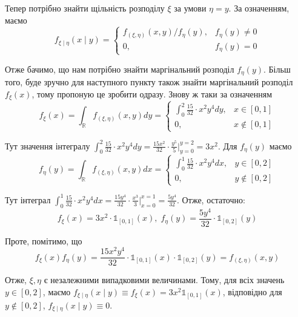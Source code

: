 \documentclass[oneside,solution]{karazin-prob-theory-assign}
\begin{document}
Тепер потрібно знайти щільність розподілу $\xi$ за умови $\eta=y$. За означенням, маємо
\begin{equation}
f_{\xi \mid \eta}(x \mid y) = \begin{cases}
    f_{(\xi,\eta)}(x,y)/f_{\eta}(y), & f_{\eta}(y) \neq 0 \\
    0, & f_{\eta}(y) = 0
\end{cases}    
\end{equation}

Отже бачимо, що нам потрібно знайти маргінальний розподіл $f_{\eta}(y)$. Більш того, буде зручно для наступного пункту також знайти маргінальний розподіл $f_{\xi}(x)$, тому пропоную це зробити одразу. Знову ж таки за означенням
\begin{equation}
    f_{\xi}(x) = \int_{\mathbb{R}}f_{(\xi,\eta)}(x,y)dy = \begin{cases}
        \int_0^2 \frac{15}{32} \cdot x^2y^4 dy, & x \in [0,1] \\
        0, & x \not\in [0,1]
    \end{cases} 
\end{equation}

Тут значення інтегралу $\int_0^2 \frac{15}{32}\cdot x^2y^4dy = \frac{15x^2}{32} \cdot \frac{y^5}{5}\Big|_{y=0}^{y=2} = 3x^2$. Для $f_{\eta}(y)$ маємо
\begin{equation}
    f_{\eta}(y) = \int_{\mathbb{R}}f_{(\xi,\eta)}(x,y)dx = \begin{cases}
        \int_0^1 \frac{15}{32} \cdot x^2y^4dx, & y \in [0,2] \\
        0, & y \not\in [0,2]
    \end{cases}
\end{equation}

Тут інтеграл $\int_0^1 \frac{15}{32}\cdot x^2y^4dx = \frac{15y^4}{32} \cdot \frac{x^3}{3}\Big|_{x=0}^{x=1} = \frac{5y^4}{32}$. Отже, остаточно:
\begin{equation}
    f_{\xi}(x) = 3x^2 \cdot \mathds{1}_{[0,1]}(x), \; f_{\eta}(y) = \frac{5y^4}{32} \cdot \mathds{1}_{[0,2]}(y)
\end{equation}

Проте, помітимо, що
\begin{equation}
    f_{\xi}(x)f_{\eta}(y) = \frac{15x^2y^4}{32}\cdot\mathds{1}_{[0,1]}(x)\cdot\mathds{1}_{[0,2]}(y) = f_{(\xi,\eta)}(x,y)
\end{equation}

Отже, $\xi,\eta$ є незалежними випадковими величинами. Тому, для всіх значень $y \in [0,2]$, маємо $f_{\xi \mid \eta}(x \mid y) \equiv f_{\xi}(x) = 3x^2 \mathds{1}_{[0,1]}(x)$, відповідно для $y \not\in [0,2]$, $f_{\xi \mid \eta}(x \mid y) \equiv 0$.
\end{document}
